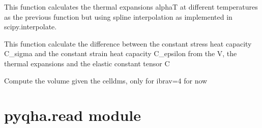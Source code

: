 \documentclass[letterpaper,10pt,english]{sphinxmanual}
\begin{document}
\begin{fulllineitems}
\label{pyqha:pyqha.properties_anis.compute_alpha_splines}
This function calculates the thermal expansions alphaT at different temperatures
as the previous function but using spline interpolation as implemented in
scipy.interpolate.

\end{fulllineitems}


\begin{fulllineitems}
\label{pyqha:pyqha.properties_anis.compute_heat_capacity}
This function calculate the difference between the constant stress heat capacity
C\_sigma and the constant strain heat capacity C\_epsilon from the V, the thermal
expansions and the elastic constant tensor C

\end{fulllineitems}


\begin{fulllineitems}
\label{pyqha:pyqha.properties_anis.compute_volume}
Compute the volume given the celldms, only for ibrav=4 for now

\end{fulllineitems}



\section{pyqha.read module}
\label{pyqha:pyqha-read-module}\label{pyqha:module-pyqha.read}
\end{document}
